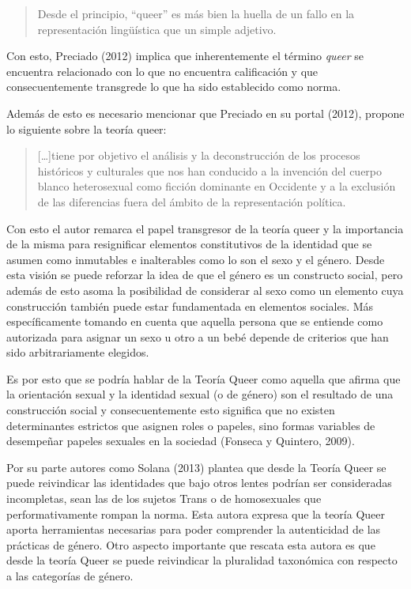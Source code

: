 \begin{quote}
    Desde el principio, “queer” es más bien la huella de un fallo en la
    representación lingüística que un simple adjetivo.
\end{quote}

Con esto, Preciado (2012) implica que inherentemente el término \emph{queer} se encuentra
relacionado con lo que no encuentra calificación y que consecuentemente
transgrede lo que ha sido establecido como norma.

Además de esto es necesario mencionar que Preciado en su portal (2012),
propone lo siguiente sobre la teoría queer:

\begin{quote}
    […]tiene por objetivo el análisis y la deconstrucción de los procesos históricos
    y culturales que nos han conducido a la invención del cuerpo blanco
    heterosexual como ficción dominante en Occidente y a la exclusión de las
    diferencias fuera del ámbito de la representación política.
\end{quote}

Con esto el autor remarca el papel transgresor de la teoría queer y la
importancia de la misma para resignificar elementos constitutivos de la
identidad que se asumen como inmutables e inalterables como lo son el sexo y el
género.
Desde esta visión se puede reforzar la idea de que el género es un constructo
social, pero además de esto asoma la posibilidad de considerar al sexo como un
elemento cuya construcción también puede estar fundamentada en elementos
sociales.
Más específicamente tomando en cuenta que aquella persona que se
entiende como autorizada para asignar un sexo u otro a un bebé depende de
criterios que han sido arbitrariamente elegidos.

Es por esto que se podría hablar de la Teoría Queer como aquella que afirma que
la orientación sexual y la identidad sexual (o de género) son el resultado de
una construcción social y consecuentemente esto significa que no existen
determinantes estrictos que asignen roles o papeles, sino formas variables de
desempeñar papeles sexuales en la sociedad (Fonseca y Quintero, 2009).

Por su parte autores como Solana (2013) plantea que desde la Teoría Queer se
puede reivindicar las identidades que bajo otros lentes podrían ser consideradas
incompletas, sean las de los sujetos Trans o de homosexuales que
performativamente rompan la norma.
Esta autora expresa que la teoría Queer aporta herramientas necesarias para
poder comprender la autenticidad de las prácticas de género.
Otro aspecto importante que rescata esta autora es que desde la teoría Queer se
puede reivindicar la pluralidad taxonómica con respecto a las categorías de
género.

